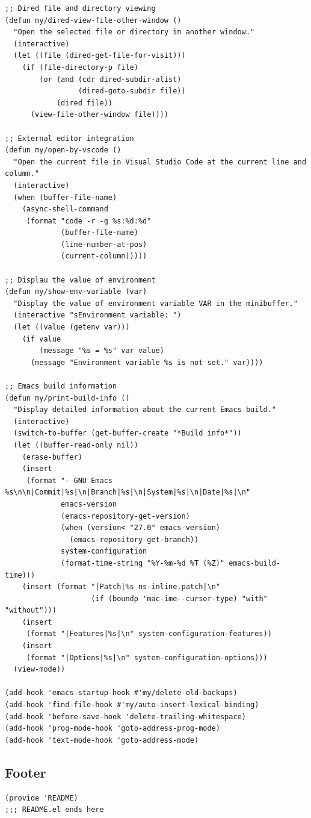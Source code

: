 \documentclass[11pt]{article}
\begin{document}
\begin{verbatim}
;; Dired file and directory viewing
(defun my/dired-view-file-other-window ()
  "Open the selected file or directory in another window."
  (interactive)
  (let ((file (dired-get-file-for-visit)))
    (if (file-directory-p file)
        (or (and (cdr dired-subdir-alist)
                 (dired-goto-subdir file))
            (dired file))
      (view-file-other-window file))))

;; External editor integration
(defun my/open-by-vscode ()
  "Open the current file in Visual Studio Code at the current line and column."
  (interactive)
  (when (buffer-file-name)
    (async-shell-command
     (format "code -r -g %s:%d:%d"
             (buffer-file-name)
             (line-number-at-pos)
             (current-column)))))

;; Displau the value of environment
(defun my/show-env-variable (var)
  "Display the value of environment variable VAR in the minibuffer."
  (interactive "sEnvironment variable: ")
  (let ((value (getenv var)))
    (if value
        (message "%s = %s" var value)
      (message "Environment variable %s is not set." var))))

;; Emacs build information
(defun my/print-build-info ()
  "Display detailed information about the current Emacs build."
  (interactive)
  (switch-to-buffer (get-buffer-create "*Build info*"))
  (let ((buffer-read-only nil))
    (erase-buffer)
    (insert
     (format "- GNU Emacs %s\n\n|Commit|%s|\n|Branch|%s|\n|System|%s|\n|Date|%s|\n"
             emacs-version
             (emacs-repository-get-version)
             (when (version< "27.0" emacs-version)
               (emacs-repository-get-branch))
             system-configuration
             (format-time-string "%Y-%m-%d %T (%Z)" emacs-build-time)))
    (insert (format "|Patch|%s ns-inline.patch|\n"
                    (if (boundp 'mac-ime--cursor-type) "with" "without")))
    (insert
     (format "|Features|%s|\n" system-configuration-features))
    (insert
     (format "|Options|%s|\n" system-configuration-options)))
  (view-mode))

(add-hook 'emacs-startup-hook #'my/delete-old-backups)
(add-hook 'find-file-hook #'my/auto-insert-lexical-binding)
(add-hook 'before-save-hook 'delete-trailing-whitespace)
(add-hook 'prog-mode-hook 'goto-address-prog-mode)
(add-hook 'text-mode-hook 'goto-address-mode)
\end{verbatim}
\subsection{Footer}
\label{sec:org8ae6310}
\begin{verbatim}
(provide 'README)
;;; README.el ends here
\end{verbatim}
\end{document}
